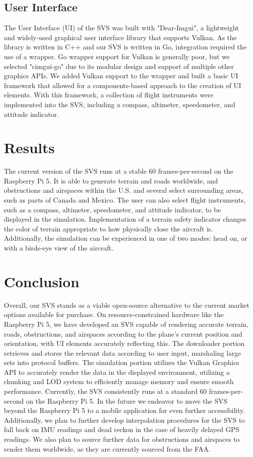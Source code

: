 \documentclass[journal ]{new-aiaa}
\begin{document}
\subsection{User Interface}
The User Interface (UI) of the SVS was built with "Dear-Imgui", a lightweight and widely-used graphical user interface library that supports Vulkan. As the library is written in C++ and our SVS is written in Go, integration required the use of a wrapper. Go wrapper support for Vulkan is generally poor, but we selected "cimgui-go" due to its modular design and support of multiple other graphics APIs. We added Vulkan support to the wrapper and built a basic UI framework that allowed for a components-based approach to the creation of UI elements. With this framework, a collection of flight instruments were implemented into the SVS, including a compass, altimeter, speedometer, and attitude indicator.

\section{Results}
The current version of the SVS runs at a stable 60 frames-per-second on the Raspberry Pi 5. It is able to generate terrain and roads worldwide, and obstructions and airspaces within the U.S. and several select surrounding areas, such as parts of Canada and Mexico. The user can also select flight instruments, such as a compass, altimeter, speedometer, and attitude indicator, to be displayed in the simulation. Implementation of a terrain safety indicator changes the color of terrain appropriate to how physically close the aircraft is. Additionally, the simulation can be experienced in one of two modes: head on, or with a birds-eye view of the aircraft.

\section{Conclusion}
Overall, our SVS stands as a viable open-source alternative to the current market options available for purchase. On resource-constrained hardware like the Raspberry Pi 5, we have developed an SVS capable of rendering accurate terrain, roads, obstructions, and airspaces according to the plane's current position and orientation, with UI elements accurately reflecting this. The downloader portion retrieves and stores the relevant data according to user input, marshaling large sets into protocol buffers. The simulation portion utilizes the Vulkan Graphics API to accurately render the data in the displayed environment, utilizing a chunking and LOD system to efficiently manage memory and ensure smooth performance. Currently, the SVS consistently runs at a standard 60 frames-per-second on the Raspberry Pi 5. In the future we endeavor to move the SVS beyond the Raspberry Pi 5 to a mobile application for even further accessibility. Additionally, we plan to further develop interpolation procedures for the SVS to fall back on IMU readings and dead reckon in the case of heavily delayed GPS readings. We also plan to source further data for obstructions and airspaces to render them worldwide, as they are currently sourced from the FAA.


\end{document}
